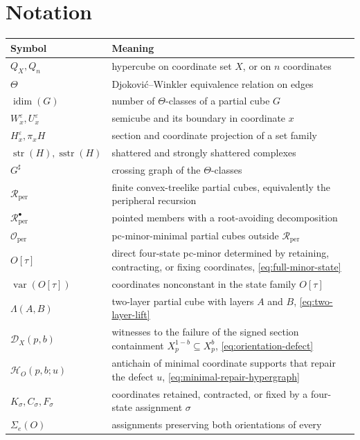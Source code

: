 \documentclass[11pt]{article}
\theoremstyle{definition}
\theoremstyle{remark}
\newcommand{\Rper}{\mathcal R_{\mathrm{per}}}
\newcommand{\Rbullet}{\mathcal R_{\mathrm{per}}^{\bullet}}
\newcommand{\Oper}{\mathcal O_{\mathrm{per}}}
\newcommand{\idim}{\operatorname{idim}}
\newcommand{\strc}{\operatorname{str}}
\newcommand{\sstrc}{\operatorname{sstr}}
\newcommand{\eps}{\varepsilon}
\begin{document}
\section{Notation}

\begin{center}
\small
\begin{tabular}{@{}p{}p{}@{}}
\toprule
Symbol & Meaning\\
\midrule
\(Q_X,Q_n\) & hypercube on coordinate set \(X\), or on \(n\) coordinates\\
\(\Theta\) & Djokovi\'c--Winkler equivalence relation on edges\\
\(\idim(G)\) & number of \(\Theta\)-classes of a partial cube \(G\)\\
\(W_x^\eps,U_x^\eps\) & semicube and its boundary in coordinate \(x\)\\
\(H_x^\eps,\pi_xH\) & section and coordinate projection of a set family\\
\(\strc(H),\sstrc(H)\) & shattered and strongly shattered complexes\\
\(G^\sharp\) & crossing graph of the \(\Theta\)-classes\\
\(\Rper\) & finite convex-treelike partial cubes, equivalently the peripheral recursion\\
\(\Rbullet\) & pointed members with a root-avoiding decomposition\\
\(\Oper\) & pc-minor-minimal partial cubes outside \(\Rper\)\\
\(O[\tau]\) & direct four-state pc-minor determined by retaining,
  contracting, or fixing coordinates, \cref{eq:full-minor-state}\\
\(\operatorname{var}(O[\tau])\) & coordinates nonconstant in the state
  family \(O[\tau]\)\\
\(\Lambda(A,B)\) & two-layer partial cube with layers \(A\) and \(B\),
  \cref{eq:two-layer-lift}\\
\(\mathcal D_X(p,b)\) & witnesses to the failure of the signed section
  containment \(X_p^{1-b}\subseteq X_p^b\),
  \cref{eq:orientation-defect}\\
\(\mathcal H_O(p,b;u)\) & antichain of minimal coordinate supports that
  repair the defect \(u\), \cref{eq:minimal-repair-hypergraph}\\
\(K_\sigma,C_\sigma,F_\sigma\) & coordinates retained, contracted, or fixed
  by a four-state assignment \(\sigma\)\\
\(\Sigma_e(O)\) & assignments preserving both orientations of every

\end{tabular}
\end{center}
\end{document}
